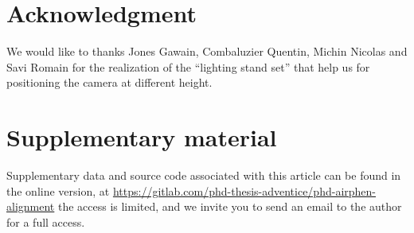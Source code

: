 \documentclass[]{elsarticle}
\begin{document}
	\section{Acknowledgment}
	
	We would like to thanks Jones Gawain, Combaluzier Quentin, Michin Nicolas and Savi Romain
	for the realization of the ``lighting stand set'' that help us for positioning the camera at different height.
	
	\section{Supplementary material}
	
	Supplementary data and source code associated with this article can be found in the online version, at
	\url{https://gitlab.com/phd-thesis-adventice/phd-airphen-alignment} the access is limited,
	and we invite you to send an email to the author for a full access.
	
	
	
	
\end{document}
